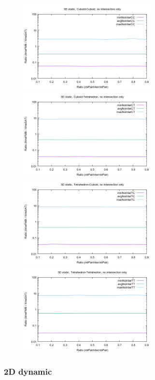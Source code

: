 \documentclass[12pt, a4paper]{article}
\begin{document}
\begin{center}
\begin{figure}[H]
\centering\includegraphics[width=7cm]{../Results/qualification3DCCnointer.png}
\centering\includegraphics[width=7cm]{../Results/qualification3DCTnointer.png}
\centering\includegraphics[width=7cm]{../Results/qualification3DTCnointer.png}
\centering\includegraphics[width=7cm]{../Results/qualification3DTTnointer.png}
\end{figure}
\end{center}

\subsubsection{2D dynamic}
\end{document}

